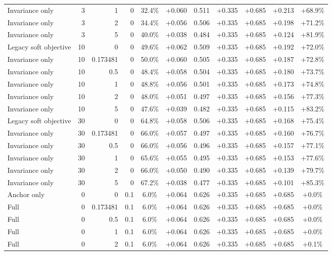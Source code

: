 \begin{table}[htbp]
\begin{tabular}{lrrrccccccc}
Invariance only & 3 & 1 & 0 & 32.4\% & +0.060 & 0.511 & +0.335 & +0.685 & +0.213 & +68.9\% \\
Invariance only & 3 & 2 & 0 & 34.4\% & +0.056 & 0.506 & +0.335 & +0.685 & +0.198 & +71.2\% \\
Invariance only & 3 & 5 & 0 & 40.0\% & +0.038 & 0.484 & +0.335 & +0.685 & +0.124 & +81.9\% \\
Legacy soft objective & 10 & 0 & 0 & 49.6\% & +0.062 & 0.509 & +0.335 & +0.685 & +0.192 & +72.0\% \\
Invariance only & 10 & 0.173481 & 0 & 50.0\% & +0.060 & 0.505 & +0.335 & +0.685 & +0.187 & +72.8\% \\
Invariance only & 10 & 0.5 & 0 & 48.4\% & +0.058 & 0.504 & +0.335 & +0.685 & +0.180 & +73.7\% \\
Invariance only & 10 & 1 & 0 & 48.8\% & +0.056 & 0.501 & +0.335 & +0.685 & +0.173 & +74.8\% \\
Invariance only & 10 & 2 & 0 & 48.0\% & +0.051 & 0.497 & +0.335 & +0.685 & +0.156 & +77.3\% \\
Invariance only & 10 & 5 & 0 & 47.6\% & +0.039 & 0.482 & +0.335 & +0.685 & +0.115 & +83.2\% \\
Legacy soft objective & 30 & 0 & 0 & 64.8\% & +0.058 & 0.506 & +0.335 & +0.685 & +0.168 & +75.4\% \\
Invariance only & 30 & 0.173481 & 0 & 66.0\% & +0.057 & 0.497 & +0.335 & +0.685 & +0.160 & +76.7\% \\
Invariance only & 30 & 0.5 & 0 & 66.0\% & +0.056 & 0.496 & +0.335 & +0.685 & +0.157 & +77.1\% \\
Invariance only & 30 & 1 & 0 & 65.6\% & +0.055 & 0.495 & +0.335 & +0.685 & +0.153 & +77.6\% \\
Invariance only & 30 & 2 & 0 & 66.0\% & +0.050 & 0.490 & +0.335 & +0.685 & +0.139 & +79.7\% \\
Invariance only & 30 & 5 & 0 & 67.2\% & +0.038 & 0.477 & +0.335 & +0.685 & +0.101 & +85.3\% \\
Anchor only & 0 & 0 & 0.1 & 6.0\% & +0.064 & 0.626 & +0.335 & +0.685 & +0.685 & +0.0\% \\
Full & 0 & 0.173481 & 0.1 & 6.0\% & +0.064 & 0.626 & +0.335 & +0.685 & +0.685 & +0.0\% \\
Full & 0 & 0.5 & 0.1 & 6.0\% & +0.064 & 0.626 & +0.335 & +0.685 & +0.685 & +0.0\% \\
Full & 0 & 1 & 0.1 & 6.0\% & +0.064 & 0.626 & +0.335 & +0.685 & +0.685 & +0.0\% \\
Full & 0 & 2 & 0.1 & 6.0\% & +0.064 & 0.626 & +0.335 & +0.685 & +0.685 & +0.1\% \\

\end{tabular}
\end{table}
